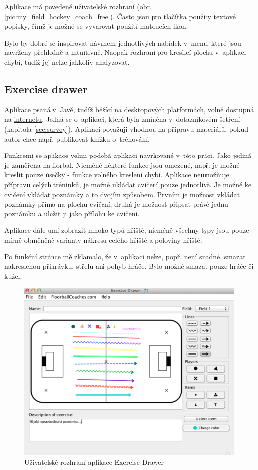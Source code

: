 \documentclass[thesis=B,czech]{FITthesis}[2012/06/26]
\begin{document}
	Aplikace má povedené uživatelské rozhraní (obr. \ref{pic:my_field_hockey_coach_free}). Často jsou pro tlačítka použity textové popisky, čímž je možné se vyvarovat použití matoucích ikon.

	Bylo by dobré se inspirovat návrhem jednotlivých nabídek v~menu, které jsou navrženy přehledně a intuitivně. Naopak rozhraní pro kreslicí plochu v~aplikaci chybí, tudíž jej nelze jakkoliv analyzovat.

	\subsection{Exercise drawer \cite{exerciseDrawerOnline}}

	Aplikace psaná v~Javě, tudíž běžící na desktopových platformách, volně dostupná na \href{http://floorballcoach.org/exercisedrawer/}{internetu}. Jedná se o~aplikaci, která byla zmíněna v~dotazníkovém šetření (kapitola \ref{sec:survey}). Aplikaci považuji vhodnou na přípravu materiálů, pokud autor chce např. publikovat knížku o~trénování.

	Funkcemi se aplikace velmi podobá aplikaci navrhované v~této práci. Jako jediná je zaměřena na florbal. Nicméně některé funkce jsou omezené, např. je možné kreslit pouze úsečky \-- funkce volného kreslení chybí. Aplikace neumožňuje přípravu celých tréninků, je možné ukládat cvičení pouze jednotlivě. Je možné ke cvičení vkládat poznámky a to dvojím způsobem. Prvním je možnost vkládat poznámky přímo na plochu cvičení, druhá je možnost připsat právě jednu poznámku a uložit ji jako přílohu ke cvičení.

	Aplikace dále umí zobrazit mnoho typů hřiště, nicméně všechny typy jsou pouze mírně obměněné varianty nákresu celého hřiště a poloviny hřiště.

	Po funkční stránce mě zklamalo, že v~aplikaci nelze, popř. není snadné, smazat nakreslenou přihrávku, střelu ani pohyb hráče. Bylo možné smazat pouze hráče či kužel.

	\begin{figure}[h!t]
		\centering
		\includegraphics[width=\textwidth]{img/competition/exercise_drawer}
		\caption{Uživatelské rozhraní aplikace Exercise Drawer}
		\label{pic:exercise_drawer}
	\end{figure}
\end{document}
